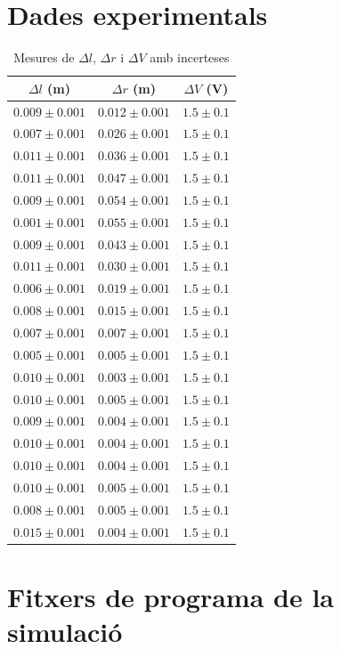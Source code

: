 \documentclass[11pt]{article}
\begin{document}
\section{Dades experimentals}
\begin{table}[ht]
    \centering
    \begin{tabular}{ccc}
        \hline
        $\Delta l$ (m) & $\Delta r$ (m) & $\Delta V$ (V) \\
        \hline
        $0.009 \pm 0.001$ & $0.012 \pm 0.001$ & $1.5 \pm 0.1$ \\
        $0.007 \pm 0.001$ & $0.026 \pm 0.001$ & $1.5 \pm 0.1$ \\
        $0.011 \pm 0.001$ & $0.036 \pm 0.001$ & $1.5 \pm 0.1$ \\
        $0.011 \pm 0.001$ & $0.047 \pm 0.001$ & $1.5 \pm 0.1$ \\
        $0.009 \pm 0.001$ & $0.054 \pm 0.001$ & $1.5 \pm 0.1$ \\
        $0.001 \pm 0.001$ & $0.055 \pm 0.001$ & $1.5 \pm 0.1$ \\
        $0.009 \pm 0.001$ & $0.043 \pm 0.001$ & $1.5 \pm 0.1$ \\
        $0.011 \pm 0.001$ & $0.030 \pm 0.001$ & $1.5 \pm 0.1$ \\
        $0.006 \pm 0.001$ & $0.019 \pm 0.001$ & $1.5 \pm 0.1$ \\
        $0.008 \pm 0.001$ & $0.015 \pm 0.001$ & $1.5 \pm 0.1$ \\
        $0.007 \pm 0.001$ & $0.007 \pm 0.001$ & $1.5 \pm 0.1$ \\
        $0.005 \pm 0.001$ & $0.005 \pm 0.001$ & $1.5 \pm 0.1$ \\
        $0.010 \pm 0.001$ & $0.003 \pm 0.001$ & $1.5 \pm 0.1$ \\
        $0.010 \pm 0.001$ & $0.005 \pm 0.001$ & $1.5 \pm 0.1$ \\
        $0.009 \pm 0.001$ & $0.004 \pm 0.001$ & $1.5 \pm 0.1$ \\
        $0.010 \pm 0.001$ & $0.004 \pm 0.001$ & $1.5 \pm 0.1$ \\
        $0.010 \pm 0.001$ & $0.004 \pm 0.001$ & $1.5 \pm 0.1$ \\
        $0.010 \pm 0.001$ & $0.005 \pm 0.001$ & $1.5 \pm 0.1$ \\
        $0.008 \pm 0.001$ & $0.005 \pm 0.001$ & $1.5 \pm 0.1$ \\
        $0.015 \pm 0.001$ & $0.004 \pm 0.001$ & $1.5 \pm 0.1$ \\
        \hline
    \end{tabular}
    \caption{Mesures de $\Delta l$, $\Delta r$ i $\Delta V$ amb incerteses}
    \label{tab:mesures}
\end{table}

\section{Fitxers de programa de la simulació}
\end{document}
